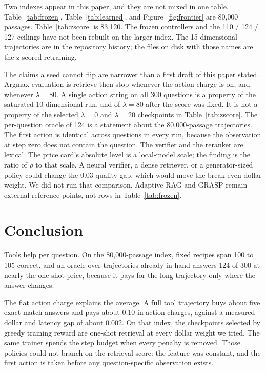 \documentclass[letterpaper]{article} %
\begin{document}
Two indexes appear in this paper, and they are not mixed in one table. Table~\ref{tab:frozen}, Table~\ref{tab:learned}, and Figure~\ref{fig:frontier} are 80{,}000 passages. Table~\ref{tab:zscore} is 83{,}120. The frozen controllers and the 110 / 124 / 127 ceilings have not been rebuilt on the larger index. The 15-dimensional trajectories are in the repository history; the files on disk with those names are the z-scored retraining.

The claims a seed cannot flip are narrower than a first draft of this paper stated. Argmax evaluation is retrieve-then-stop whenever the action charge is on, and whenever \(\lambda{=}80\). A single action string on all 300 questions is a property of the saturated 10-dimensional run, and of \(\lambda{=}80\) after the score was fixed. It is not a property of the selected \(\lambda{=}0\) and \(\lambda{=}20\) checkpoints in Table~\ref{tab:zscore}. The per-question oracle of 124 is a statement about the 80{,}000-passage trajectories. The first action is identical across questions in every run, because the observation at step zero does not contain the question. The verifier and the reranker are lexical. The price card's absolute level is a local-model scale; the finding is the ratio of \(\rho\) to that scale. A neural verifier, a dense retriever, or a generator-sized policy could change the 0.03 quality gap, which would move the break-even dollar weight. We did not run that comparison. Adaptive-RAG and GRASP remain external reference points, not rows in Table~\ref{tab:frozen}.

\section{Conclusion}
Tools help per question. On the 80{,}000-passage index, fixed recipes span 100 to 105 correct, and an oracle over trajectories already in hand answers 124 of 300 at nearly the one-shot price, because it pays for the long trajectory only where the answer changes.

The flat action charge explains the average. A full tool trajectory buys about five exact-match answers and pays about 0.10 in action charges, against a measured dollar and latency gap of about 0.002. On that index, the checkpoints selected by greedy training reward are one-shot retrieval at every dollar weight we tried. The same trainer spends the step budget when every penalty is removed. Those policies could not branch on the retrieval score: the feature was constant, and the first action is taken before any question-specific observation exists.
\end{document}
